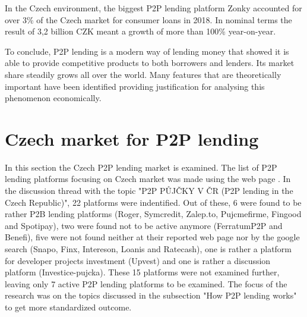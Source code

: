 In the Czech environment, the biggest P2P lending platform Zonky accounted for over 3\% of the Czech market for consumer loans in 2018. In nominal terms the result of 3,2 billion CZK meant a growth of more than 100\% year-on-year. %

To conclude, P2P lending is a modern way of lending money that showed it is able to provide competitive products to both borrowers and lenders. Its market share steadily grows all over the world. Many features that are theoretically important have been identified providing justification for analysing this phenomenon economically.
\newpage
\section{Czech market for P2P lending}

In this section the Czech P2P lending market is examined. The list of P2P lending platforms focusing on Czech market was made using the web page \cite{p2pforum}. In the discussion thread with the topic "P2P PŮJČKY V ČR (P2P lending in the Czech Republic)", 22 platforms were indentified. Out of these, 6 were found to be rather P2B lending platforms (Roger, Symcredit, Zalep.to, Pujcmefirme, Fingood and Spotipay), two were found not to be active anymore (FerratumP2P and Benefi), five were not found neither at their reported web page nor by the google search (Snapo, Finx, Intereson, Loanis and Ratecash), one is rather a platform for developer projects investment (Upvest) and one is rather a discussion platform (Investice-pujcka). These 15 platforms were not examined further, leaving only 7 active P2P lending platforms to be examined. The focus of the research was on the topics discussed in the subsection "How P2P lending works" to get more standardized outcome. 



